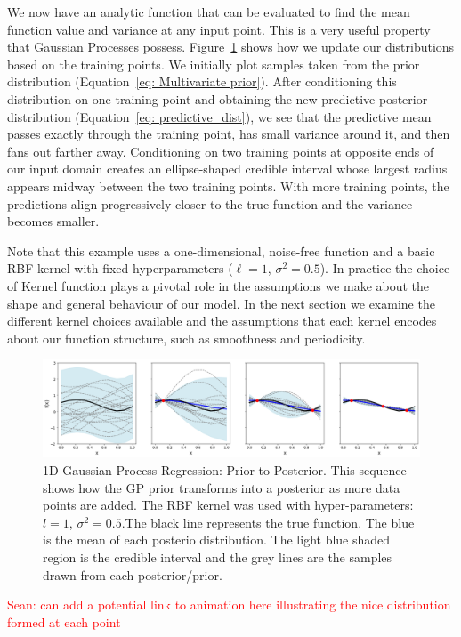 \documentclass{ucdgradtaughtthesis}
\newcommand{\Sean}[1]{{\textcolor{red}{{Sean: #1}} }}
\begin{document}
\noindent
We now have an analytic function that can be evaluated to find the mean function value and variance at any input point.
This is a very useful property that Gaussian Processes possess. Figure~\ref{fig: priortoposterior} shows how we update our
distributions based on the training points. We initially plot samples taken from the prior distribution (Equation~\ref{eq: Multivariate prior}). 
After conditioning this distribution on one training point and obtaining the new predictive posterior distribution (Equation~\ref{eq: predictive_dist}), 
we see that the predictive mean passes exactly through the training point, has small variance around it, and then fans out farther away. 
Conditioning on two training points at opposite ends of our input domain creates an ellipse-shaped credible interval whose largest radius 
appears midway between the two training points. With more training points, the predictions align progressively closer to the true function 
and the variance becomes smaller.

\noindent
Note that this example uses a one-dimensional, noise-free function and a basic RBF kernel with fixed hyperparameters (\(\ell = 1\), \(\sigma^2 = 0.5\)). 
In practice the choice of Kernel function plays a pivotal role in the assumptions we make about the shape and general behaviour of our model. In the next section
we examine the different kernel choices available and the assumptions that each kernel encodes about our function structure, such as smoothness and periodicity.



\begin{figure}[H]
    \centering
    \includegraphics[width=\textwidth]{LatexPlots/1dplots/priortoposterior.png}
    \caption[Building the posterior distribution]{1D Gaussian Process Regression: Prior to Posterior. This sequence shows how the GP prior transforms into a posterior as more data points are added. 
    The RBF kernel was used with hyper-parameters: $l = 1$, $\sigma^2 = 0.5$.The black line represents the true function. The blue is the mean of each posterio distribution. 
    The light blue shaded region is the credible interval and the grey lines are the samples drawn from each posterior/prior. }
    \label{fig: priortoposterior}
\end{figure}
\Sean{can add a potential link to animation here illustrating the nice distribution formed at each point}
\end{document}
